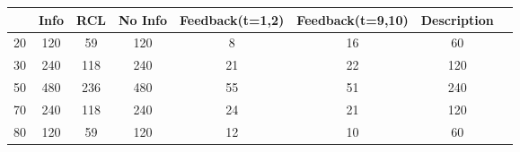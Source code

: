 {
	\def\sym#1{\ifmmode^{#1}\else\(^{#1}\)\fi}
	\begin{tabular}{l*{1}{ccccccc}}
		\toprule
		& Info & RCL & No Info  & Feedback(t=1,2) & Feedback(t=9,10) & Description   \\
		\midrule
		20         &      120 &         59 &      120   &      8  &   16  &  60 \\
		\midrule
		30         &      240 &        118 &      240   &      21  &   22 &  120 \\
		\midrule
		50         &      480 &        236 &      480   &      55  &   51 &  240 \\
		\midrule
		70         &      240 &        118 &      240   &      24  &   21 &  120 \\
		\midrule
		80         &      120 &         59 &      120   &      12  &   10 &  60 \\
		\bottomrule
	\end{tabular}
}